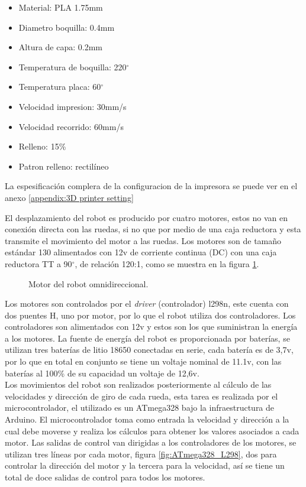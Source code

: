 \documentclass{iccmemoria}
\begin{document}
\begin{itemize}
	\item Material: PLA 1.75mm
	\item Diametro boquilla: 0.4mm
	\item Altura de capa: 0.2mm
	\item Temperatura de boquilla: 220$^{\circ}$
	\item Temperatura placa: 60$^{\circ}$
	\item Velocidad impresion: 30mm/s
	\item Velocidad recorrido: 60mm/s
	\item Relleno: 15\%
	\item Patron relleno: rectilíneo
\end{itemize}

La espesificación complera de la configuracion de la impresora se puede ver en el anexo \ref{appendix:3D printer setting}

El desplazamiento del robot es producido por cuatro motores, estos no van en conexión directa con las ruedas, si no que por medio de una caja reductora y esta transmite el movimiento del motor a las ruedas. Los motores son de tamaño estándar 130 alimentados con 12v de corriente continua (DC) con una caja reductora TT a 90$^{\circ}$, de relación 120:1, como se muestra en la figura \ref{fig:motor}.\\

\begin{figure}[H]
  \centering
  
  \caption{Motor del robot omnidireccional.}
  \label{fig:motor}
\end{figure}

Los motores son controlados por el \emph{driver} (controlador) l298n, este cuenta con dos puentes H, uno por motor, por lo que el robot utiliza dos controladores. Los controladores son alimentados con 12v y estos son los que suministran la energía a los motores.
La fuente de energía del robot es proporcionada por baterías, se utilizan tres baterías de litio 18650 conectadas en serie, cada batería es de 3,7v, por lo que en total en conjunto se tiene un voltaje nominal de 11.1v, con las baterías al 100\% de su capacidad un voltaje de 12,6v.\\

Los movimientos del robot son realizados posteriormente al cálculo de las velocidades y dirección de giro de cada rueda, esta tarea es realizada por el microcontrolador, el utilizado es un ATmega328 bajo la infraestructura de Arduino. El microcontrolador toma como entrada la velocidad y dirección a la cual debe moverse y realiza los cálculos para obtener los valores asociados a cada motor. Las salidas de control van dirigidas a los controladores de los motores, se utilizan tres líneas por cada motor, figura \ref{fig:ATmega328_L298}, dos para controlar la dirección del motor y la tercera para la velocidad, así se tiene un total de doce salidas de control para todos los motores.\\
\end{document}
